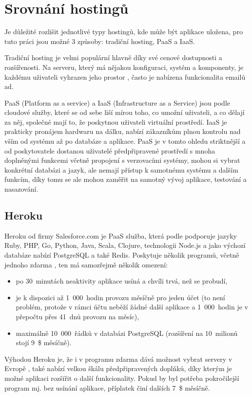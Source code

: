     \section{Srovnání hostingů}
    Je důležité rozlišit jednotlivé typy hostingů, kde může být aplikace uložena, pro tuto práci jsou možné 3 způsoby: tradiční hosting, PaaS a IaaS.
    
    Tradiční hosting je velmi populární hlavně díky své cenové dostupnosti a rozšířenosti. Na serveru, který má nějakou konfiguraci, systém a komponenty, je každému uživateli vyhrazen jeho prostor \cite{hosting2}, často je nabízena funkcionalita emailů ad.
    
    PaaS (Platform as a service) a IaaS (Infrastructure as a Service) jsou podle \cite{hosting1} cloudové služby, které se od sebe liší mírou toho, co umožní uživateli, a co dělají za něj, společné mají to, že poskytnou uživateli virtuální prostředí. IaaS je prakticky pronájem hardwaru na dálku, nabízí zákazníkům plnou kontrolu nad vším od systému až po databáze a aplikace. PaaS je v tomto ohledu striktnější a od poskytovatele dostanou uživatelé předpřipravené prostředí s mnoha doplněnými funkcemi včetně propojení s verzovacími systémy, mohou si vybrat konkrétní databázi a jazyk, ale nemají přístup k samotnému systému a dalším funkcím, díky tomu se ale mohou zaměřit na samotný vývoj aplikace, testování a nasazování.
    
        \subsection{Heroku}\label{heroku}
        Heroku od firmy Salesforce.com je PaaS služba, která podle \cite{heroku1} podporuje jazyky Ruby, PHP, Go, Python, Java, Scala, Clojure, technologii Node.js a jako výchozí databáze nabízí PostgreSQL a také Redis. Poskytuje několik programů, včetně jednoho zdarma \cite{heroku2}, ten má samozřejmě několik omezení:
            \begin{itemize}
                \item po 30~minutách neaktivity aplikace usíná a chvíli trvá, než se probudí,
                \item je k dispozici až 1~000~hodin provozu měsíčně pro jeden účet (to není problém, protože v rámci účtu neběží žádné další aplikace a 1~000~hodin je v přepočtu přes 41~dnů provozu na měsíc),
                \item maximálně 10~000~řádků v databázi PostgreSQL (rozšíření na 10~milionů stojí 9~\$ měsíčně).
            \end{itemize}
        Výhodou Heroku je, že i v programu zdarma dává možnost vybrat servery v Evropě \cite{heroku3}, také nabízí velkou škálu předpřipravených doplňků, díky kterým je možné aplikaci rozšířit o další funkcionality. Pokud by byl potřeba pokročilejší program mj. bez usínání aplikace, příplatek činí dalších 7~\$ měsíčně.
        
